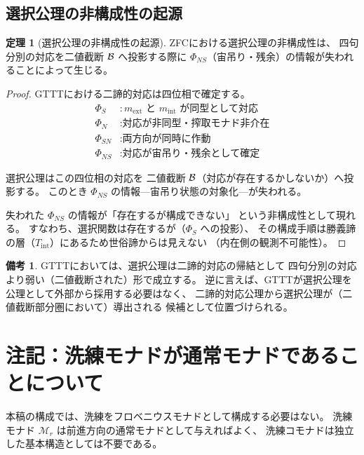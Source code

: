 \documentclass[11pt,a4paper]{article}
\newcommand{\Mr}{\mathcal{M}_r}
\newcommand{\Tint}{T_{\mathrm{int}}}
\theoremstyle{definition}
\newtheorem{theorem}{定理}[section]
\newtheorem{remark}{備考}[section]
\begin{document}
\subsection{選択公理の非構成性の起源}

\begin{theorem}[選択公理の非構成性の起源]
ZFCにおける選択公理の非構成性は、
四句分別の対応を二値截断 $\mathcal{B}$ へ投影する際に
$\Phi_{NS}$（宙吊り・残余）の情報が失われることによって生じる。
\end{theorem}

\begin{proof}
GTTTにおける二諦的対応は四位相で確定する。
\begin{align}
  \Phi_S &: m_{\mathrm{ext}} \text{ と } m_{\mathrm{int}} \text{ が同型として対応} \\
  \Phi_N &: \text{対応が非同型・搾取モナド非介在} \\
  \Phi_{SN} &: \text{両方向が同時に作動} \\
  \Phi_{NS} &: \text{対応が宙吊り・残余として確定}
\end{align}

選択公理はこの四位相の対応を
二値截断 $\mathcal{B}$（対応が存在するかしないか）へ投影する。
このとき $\Phi_{NS}$ の情報---宙吊り状態の対象化---が失われる。

失われた $\Phi_{NS}$ の情報が「存在するが構成できない」
という非構成性として現れる。
すなわち、選択関数は存在するが（$\Phi_S$ への投影）、
その構成手順は勝義諦の層（$\Tint$）にあるため世俗諦からは見えない
（内在側の観測不可能性）。
\end{proof}

\begin{remark}
GTTTにおいては、選択公理は二諦的対応の帰結として
四句分別の対応より弱い（二値截断された）形で成立する。
逆に言えば、GTTTが選択公理を公理として外部から採用する必要はなく、
二諦的対応公理から選択公理が（二値截断部分圏において）導出される
候補として位置づけられる。
\end{remark}

\section{注記：洗練モナドが通常モナドであることについて}
\label{sec:remark}

本稿の構成では、洗練をフロベニウスモナドとして構成する必要はない。
洗練モナド $\Mr$ は前進方向の通常モナドとして与えればよく、
洗練コモナドは独立した基本構造としては不要である。
\end{document}
